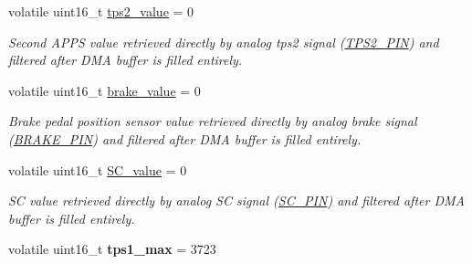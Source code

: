 \begin{DoxyCompactItemize}
\mbox{\label{group___board__model__group_gaa8a9b03858f40eadfd5d3d6c3e266834}} 
volatile uint16\+\_\+t \mbox{\hyperlink{group___board__model__group_gaa8a9b03858f40eadfd5d3d6c3e266834}{tps2\+\_\+value}} = 0
\begin{DoxyCompactList}\small\item\em Second A\+P\+PS value retrieved directly by analog tps2 signal (\mbox{\hyperlink{group___board__model__group_gab13a816bae3ca994897fc6f1cb590a67}{T\+P\+S2\+\_\+\+P\+IN}}) and filtered after D\+MA buffer is filled entirely. \end{DoxyCompactList}\item 
\mbox{\label{group___board__model__group_gad7966e70fb4bebc6947eb3fbb059a3c9}} 
volatile uint16\+\_\+t \mbox{\hyperlink{group___board__model__group_gad7966e70fb4bebc6947eb3fbb059a3c9}{brake\+\_\+value}} = 0
\begin{DoxyCompactList}\small\item\em Brake pedal position sensor value retrieved directly by analog brake signal (\mbox{\hyperlink{group___board__model__group_gad632b56bf4c6259a390c3db91607078e}{B\+R\+A\+K\+E\+\_\+\+P\+IN}}) and filtered after D\+MA buffer is filled entirely. \end{DoxyCompactList}\item 
\mbox{\label{group___board__model__group_ga0b4151ed3267a5fae4789f4b3ffe7bbd}} 
volatile uint16\+\_\+t \mbox{\hyperlink{group___board__model__group_ga0b4151ed3267a5fae4789f4b3ffe7bbd}{S\+C\+\_\+value}} = 0
\begin{DoxyCompactList}\small\item\em SC value retrieved directly by analog SC signal (\mbox{\hyperlink{group___board__model__group_gabbdb157ae4ad39d102935c21fa30d1c5}{S\+C\+\_\+\+P\+IN}}) and filtered after D\+MA buffer is filled entirely. \end{DoxyCompactList}\item 
\mbox{\label{group___board__model__group_gaf1d46fb483b2a63c3da25c11688af7c4}} 
volatile uint16\+\_\+t {\bfseries tps1\+\_\+max} = 3723
\item 
\mbox{\label{group___board__model__group_ga51d40eb16833e50f71e595ab0a45795e}} 

\end{DoxyCompactItemize}
